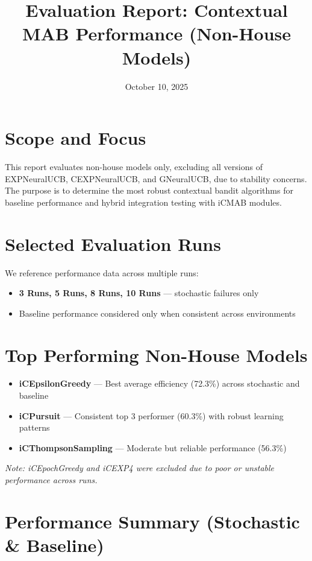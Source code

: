 \documentclass[12pt,a4paper]{article}
\title{Evaluation Report: Contextual MAB Performance (Non-House Models)}
\date{October 10, 2025}
\begin{document}
\maketitle

\section*{Scope and Focus}
This report evaluates non-house models only, excluding all versions of EXPNeuralUCB, CEXPNeuralUCB, and GNeuralUCB, due to stability concerns. The purpose is to determine the most robust contextual bandit algorithms for baseline performance and hybrid integration testing with iCMAB modules.

\section*{Selected Evaluation Runs}
We reference performance data across multiple runs:
\begin{itemize}
  \item \textbf{3 Runs, 5 Runs, 8 Runs, 10 Runs} — stochastic failures only
  \item Baseline performance considered only when consistent across environments
\end{itemize}

\section*{Top Performing Non-House Models}

\begin{tcolorbox}[colback=highlightcolor!30, colframe=successcolor, title=Recommended Models]
\begin{itemize}
  \item \textbf{iCEpsilonGreedy} — Best average efficiency (72.3\%) across stochastic and baseline
  \item \textbf{iCPursuit} — Consistent top 3 performer (60.3\%) with robust learning patterns
  \item \textbf{iCThompsonSampling} — Moderate but reliable performance (56.3\%)
\end{itemize}
\end{tcolorbox}

\textit{Note: iCEpochGreedy and iCEXP4 were excluded due to poor or unstable performance across runs.}

\section*{Performance Summary (Stochastic \& Baseline)}
\end{document}
